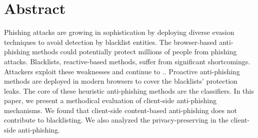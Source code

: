 \section{Abstract}
\label{s:intro}
Phishing attacks are growing in sophistication by deploying diverse evasion techniques to avoid detection by blacklist entities. The browser-based anti-phishing methods could potentially protect millions of people from phishing attacks. Blacklists, reactive-based methods, suffer from significant shortcomings. Attackers exploit these weaknesses and continue to ..
Proactive anti-phishing methods are deployed in modern browsers to cover the blacklists' protection leaks. The core of these heuristic anti-phishing methods are the classifiers. In this paper, we present a methodical evaluation of client-side anti-phishing mechanisms. We found that client-side content-based anti-phishing does not contribute to blacklisting. We also analyzed the privacy-preserving in the client-side anti-phishing.
